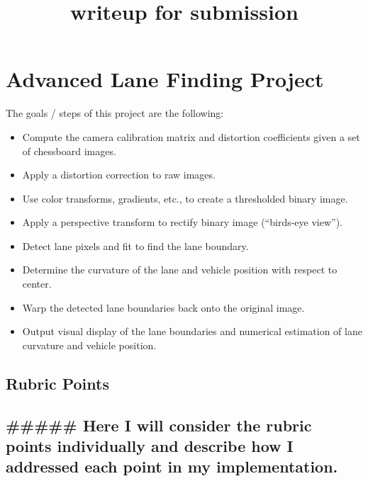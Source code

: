 \documentclass[11pt]{article}
\title{writeup for submission}
\providecommand{\tightlist}{%
      \setlength{\itemsep}{0pt}\setlength{\parskip}{0pt}}
\begin{document}
    
    
    \maketitle
    
    

    
    \hypertarget{advanced-lane-finding-project}{%
\section{Advanced Lane Finding
Project}\label{advanced-lane-finding-project}}

The goals / steps of this project are the following:

\begin{itemize}
\tightlist
\item
  Compute the camera calibration matrix and distortion coefficients
  given a set of chessboard images.
\item
  Apply a distortion correction to raw images.
\item
  Use color transforms, gradients, etc., to create a thresholded binary
  image.
\item
  Apply a perspective transform to rectify binary image (``birds-eye
  view'').
\item
  Detect lane pixels and fit to find the lane boundary.
\item
  Determine the curvature of the lane and vehicle position with respect
  to center.
\item
  Warp the detected lane boundaries back onto the original image.
\item
  Output visual display of the lane boundaries and numerical estimation
  of lane curvature and vehicle position.
\end{itemize}

    \hypertarget{rubric-points}{%
\subsection{Rubric Points}\label{rubric-points}}

\hypertarget{here-i-will-consider-the-rubric-points-individually-and-describe-how-i-addressed-each-point-in-my-implementation.}{%
\subsection{\#\#\#\#\# Here I will consider the rubric points
individually and describe how I addressed each point in my
implementation.}\label{here-i-will-consider-the-rubric-points-individually-and-describe-how-i-addressed-each-point-in-my-implementation.}}
\end{document}
